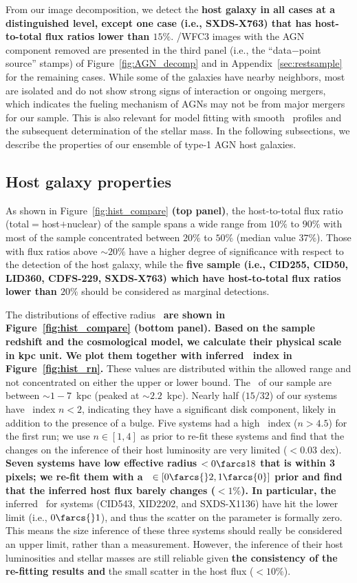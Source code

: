 \documentclass[apj]{emulateapj}
\begin{document}
From our image decomposition, we detect the {\bf host galaxy in all cases at a distinguished level, except one case (i.e., SXDS-X763) that has host-to-total flux ratios lower than $15\%$}. \hst/WFC3 images with the AGN component removed are presented in the third panel (i.e., the ``data$-$point source'' stamps) of Figure~\ref{fig:AGN_decomp} and in Appendix~\ref{sec:restsample} for the remaining cases. While some of the galaxies have nearby neighbors, most are isolated and do not show strong signs of interaction or ongoing mergers, which indicates the fueling mechanism of AGNs may not be from major mergers for our sample. This is also relevant for model fitting with smooth \sersic\ profiles and the subsequent determination of the stellar mass. In the following subsections, we describe the properties of our ensemble of type-1 AGN host galaxies.
 
\subsection{Host galaxy properties}
\label{sec:result-hosts}
As shown in Figure~\ref{fig:hist_compare} {\bf (top panel)}, the host-to-total flux ratio (total$=$host$+$nuclear) of the sample spans a wide range from $10\%$ to $90\%$ with most of the sample concentrated between $20\%$ to $50\%$ (median value $37\%$). Those with flux ratios above $\sim20\%$ have a higher degree of significance with respect to the detection of the host galaxy, while the {\bf five sample (i.e., CID255, CID50, LID360, CDFS-229, SXDS-X763) which have host-to-total flux ratios lower than $20\%$} should be considered as marginal detections. 

The distributions of effective radius \Reff\ {\bf are shown in Figure~\ref{fig:hist_compare} {\bf (bottom panel)}. Based on the sample redshift and the cosmological model, we calculate their physical scale in kpc unit. We plot them together with inferred \sersic\ index in Figure~\ref{fig:hist_rn}.} These values are distributed within the allowed range and not concentrated on either the upper or lower bound. The \Reff\ of our sample are between $\sim1-7$~kpc (peaked at $\sim2.2$~kpc). Nearly half ($15/32$) of our systems have \sersic\ index $n<2$, indicating they have a significant disk component, likely in addition to the presence of a bulge. Five systems had a high \sersic\ index ($n>4.5$) for the first run; we use $n\in[1,4]$ as prior to re-fit these systems and find that the changes on the inference of their host luminosity are very limited ($<0.03$ dex). 
{\bf Seven systems have low effective radius \Reff$<0\farcs18$ that is within 3 pixels; we re-fit them with a \Reff\ $\in[0\farcs{}2,1\farcs{0}]$ prior and find that the inferred host flux barely changes ($<1\%$). In particular, the}
inferred \Reff\ for systems (CID543, XID2202, and SXDS-X1136) have hit the lower limit (i.e., $0\farcs{}1$), and thus the scatter on the parameter is formally zero. This means the size inference of these three systems should really be considered an upper limit, rather than a measurement. However, the inference of their host luminosities and stellar masses are still reliable given {\bf the consistency of the re-fitting results and} the small scatter in the host flux ($<10\%$).
\end{document}
